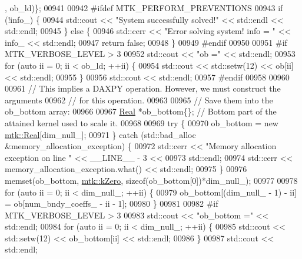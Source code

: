\begin{DoxyCode}
{{      , ob\_ld)\};
00941 
00942 \textcolor{preprocessor}{    #ifdef MTK\_PERFORM\_PREVENTIONS}
00943     \textcolor{keywordflow}{if} (!info\_) \{
00944       std::cout << \textcolor{stringliteral}{"System successfully solved!"} << std::endl << std::endl;
00945     \} \textcolor{keywordflow}{else} \{
00946       std::cerr << \textcolor{stringliteral}{"Error solving system! info = "} << info\_ << std::endl;
00947       \textcolor{keywordflow}{return} \textcolor{keyword}{false};
00948     \}
00949 \textcolor{preprocessor}{    #endif}
00950 
00951 \textcolor{preprocessor}{    #if MTK\_VERBOSE\_LEVEL > 3}
00952     std::cout << \textcolor{stringliteral}{"ob ="} << std::endl;
00953     \textcolor{keywordflow}{for} (\textcolor{keyword}{auto} ii = 0; ii < ob\_ld; ++ii) \{
00954       std::cout << std::setw(12) << ob[ii] << std::endl;
00955     \}
00956     std::cout << std::endl;
00957 \textcolor{preprocessor}{    #endif}
00958 
00960 
00961     \textcolor{comment}{// This implies a DAXPY operation. However, we must construct the arguments}
00962     \textcolor{comment}{// for this operation.}
00963 
00965     \textcolor{comment}{// Save them into the ob\_bottom array:}
00966 
00967     \hyperlink{group__c01-roots_gac080bbbf5cbb5502c9f00405f894857d}{Real} *ob\_bottom\{\}; \textcolor{comment}{// Bottom part of the attained kernel used to scale it.}
00968 
00969     \textcolor{keywordflow}{try} \{
00970       ob\_bottom = \textcolor{keyword}{new} \hyperlink{group__c01-roots_gac080bbbf5cbb5502c9f00405f894857d}{mtk::Real}[dim\_null\_];
00971     \} \textcolor{keywordflow}{catch} (std::bad\_alloc &memory\_allocation\_exception) \{
00972       std::cerr << \textcolor{stringliteral}{"Memory allocation exception on line "} << \_\_LINE\_\_ - 3 <<
00973         std::endl;
00974       std::cerr << memory\_allocation\_exception.what() << std::endl;
00975     \}
00976     memset(ob\_bottom, \hyperlink{group__c01-roots_ga59a451a5fae30d59649bcda274fea271}{mtk::kZero}, \textcolor{keyword}{sizeof}(ob\_bottom[0])*dim\_null\_);
00977 
00978     \textcolor{keywordflow}{for} (\textcolor{keyword}{auto} ii = 0; ii < dim\_null\_; ++ii) \{
00979       ob\_bottom[(dim\_null\_ - 1) - ii] = ob[num\_bndy\_coeffs\_ - ii - 1];
00980     \}
00981 
00982 \textcolor{preprocessor}{    #if MTK\_VERBOSE\_LEVEL > 3}
00983     std::cout << \textcolor{stringliteral}{"ob\_bottom ="} << std::endl;
00984     \textcolor{keywordflow}{for} (\textcolor{keyword}{auto} ii = 0; ii < dim\_null\_; ++ii) \{
00985       std::cout << std::setw(12) << ob\_bottom[ii] << std::endl;
00986     \}
00987     std::cout << std::endl;
}}
\end{DoxyCode}
